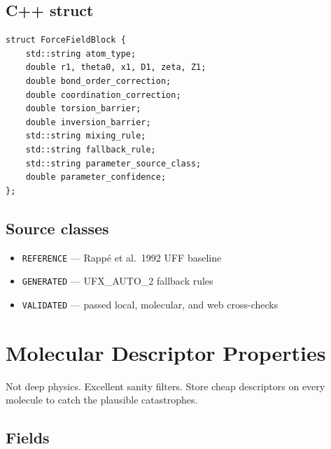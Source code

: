 \documentclass[11pt, a4paper]{article}
\begin{document}
\subsection{C++ struct}

\begin{lstlisting}
struct ForceFieldBlock {
    std::string atom_type;
    double r1, theta0, x1, D1, zeta, Z1;
    double bond_order_correction;
    double coordination_correction;
    double torsion_barrier;
    double inversion_barrier;
    std::string mixing_rule;
    std::string fallback_rule;
    std::string parameter_source_class;
    double parameter_confidence;
};
\end{lstlisting}

\subsection{Source classes}

\begin{itemize}[itemsep=1pt, leftmargin=*]
  \item \texttt{REFERENCE} --- Rapp\'{e} et al.\ 1992 UFF baseline
  \item \texttt{GENERATED} --- UFX\_AUTO\_2 fallback rules
  \item \texttt{VALIDATED} --- passed local, molecular, and web cross-checks
\end{itemize}

\section{Molecular Descriptor Properties}

Not deep physics. Excellent sanity filters. Store cheap descriptors on every molecule to catch the plausible catastrophes.

\subsection{Fields}
\end{document}
